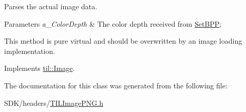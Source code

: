 Parses the actual image data. 


\begin{DoxyParams}{Parameters}
{\em a\_\-ColorDepth} & The color depth received from \hyperlink{classtil_1_1_image_ae1202f84c0addb81eba161f746a9d4cc}{SetBPP};\\
\hline
\end{DoxyParams}
This method is pure virtual and should be overwritten by an image loading implementation. 

Implements \hyperlink{classtil_1_1_image_a2436c982f6b403ab07591f06107fe432}{til::Image}.



The documentation for this class was generated from the following file:\begin{DoxyCompactItemize}
\item 
SDK/headers/\hyperlink{_t_i_l_image_p_n_g_8h}{TILImagePNG.h}\end{DoxyCompactItemize}
